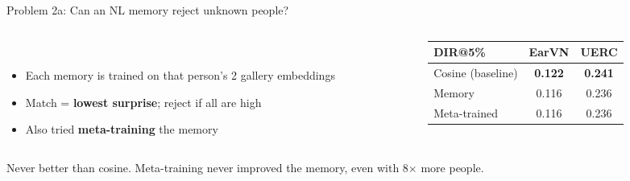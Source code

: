 \documentclass[aspectratio=169,10pt]{beamer}
\newcommand{\takeaway}[1]{\vfill\begin{center}\colorbox{accent!10}{\parbox{0.92\textwidth}{\centering\vspace{3pt}#1\vspace{3pt}}}\end{center}}
\begin{document}
\begin{frame}{Problem 2a: Can an NL memory reject unknown people?}
\begin{columns}[T]
\begin{column}{0.52\textwidth}
\centering
{}\\[3pt]
\raggedright\small
\begin{itemize}
  \item Each memory is trained on that person's 2 gallery embeddings
  \item Match = \textbf{lowest surprise}; reject if all are high
  \item Also tried \textbf{meta-training} the memory
\end{itemize}
\end{column}
\begin{column}{0.44\textwidth}
\centering
\begin{tabular}{lcc}
\toprule
\textbf{DIR@5\%} & \textbf{EarVN} & \textbf{UERC}\\
\midrule
Cosine (baseline) & \textbf{0.122} & \textbf{0.241}\\
Memory & 0.116 & 0.236\\
Meta-trained & 0.116 & 0.236\\
\bottomrule
\end{tabular}
\end{column}
\end{columns}

\takeaway{Never better than cosine. Meta-training never improved the memory, even with 8$\times$ more people.}
\end{frame}
\end{document}
